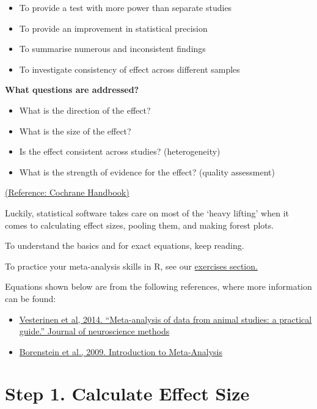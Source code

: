 \documentclass[
]{book}
\begin{document}
\begin{itemize}
\item
  To provide a test with more power than separate studies
\item
  To provide an improvement in statistical precision
\item
  To summarise numerous and inconsistent findings
\item
  To investigate consistency of effect across different samples
\end{itemize}

\textbf{What questions are addressed?}

\begin{itemize}
\item
  What is the direction of the effect?
\item
  What is the size of the effect?
\item
  Is the effect consistent across studies? (heterogeneity)
\item
  What is the strength of evidence for the effect? (quality assessment)
\end{itemize}

\href{http://www.cochrane-handbook.org/}{(Reference: Cochrane Handbook)}

Luckily, statistical software takes care on most of the `heavy lifting' when it comes to calculating effect sizes, pooling them, and making forest plots.

To understand the basics and for exact equations, keep reading.

To practice your meta-analysis skills in R, see our \href{Exercises.html}{exercises section.}

Equations shown below are from the following references, where more information can be found:

\begin{itemize}
\item
  \href{https://doi.org/10.1016/j.jneumeth.2013.09.010}{Vesterinen et al, 2014. ``Meta-analysis of data from animal studies: a practical guide.'' Journal of neuroscience methods}
\item
  \href{https://doi.org/10.1002/9780470743386}{Borenstein et al., 2009. Introduction to Meta-Analysis}
\end{itemize}

\hypertarget{step-1.-calculate-effect-size}{%
\section{Step 1. Calculate Effect Size}\label{step-1.-calculate-effect-size}}
\end{document}
